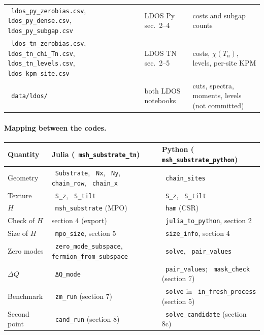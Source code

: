 \documentclass[11pt]{article}
\renewcommand{\code}[1]{\texttt{\hyphenchar\font=-1 #1}}
\begin{document}
\begin{center}
\begin{tabularx}{\textwidth}{>{\raggedright}p{4.6cm}>{\raggedright}p{3.6cm}>{\raggedright\arraybackslash}X}
\code{ldos\_py\_zerobias.csv}, \code{ldos\_py\_dense.csv}, \code{ldos\_py\_subgap.csv} & LDOS Py sec.~2--4 & costs and subgap counts\\
\code{ldos\_tn\_zerobias.csv}, \code{ldos\_tn\_chi\_Tn.csv}, \code{ldos\_tn\_levels.csv}, \code{ldos\_kpm\_site.csv} & LDOS TN sec.~2--5 & costs, $\chi(T_n)$, levels, per-site KPM\\
\code{data/ldos/} & both LDOS notebooks & cuts, spectra, moments, levels (not committed)\\
\bottomrule
\end{tabularx}
\end{center}

\paragraph{Mapping between the codes.}
\begin{center}
\small
\begin{tabularx}{\textwidth}{>{\raggedright}p{3.2cm}>{\raggedright}p{5.4cm}>{\raggedright\arraybackslash}X}
\toprule
Quantity & Julia (\code{msh\_substrate\_tn}) & Python (\code{msh\_substrate\_python})\\
\midrule
Geometry & \code{Substrate}, \code{Nx}, \code{Ny}, \code{chain\_row}, \code{chain\_x} & \code{chain\_sites}\\
Texture & \code{S\_z}, \code{S\_tilt} & \code{S\_z}, \code{S\_tilt}\\
$H$ & \code{msh\_substrate} (MPO) & \code{ham} (CSR)\\
Check of $H$ & section 4 (export) & \code{julia\_to\_python}, section 2\\
Size of $H$ & \code{mpo\_size}, section 5 & \code{size\_info}, section 4\\
Zero modes & \code{zero\_mode\_subspace}, \code{fermion\_from\_subspace} & \code{solve}, \code{pair\_values}\\
$\Delta Q$ & \code{ΔQ\_mode} & \code{pair\_values}; \code{mask\_check} (section 7)\\
Benchmark & \code{zm\_run} (section 7) & \code{solve} in \code{in\_fresh\_process} (section 5)\\
Second point & \code{cand\_run} (section 8) & \code{solve\_candidate} (section 8c)\\
\bottomrule
\end{tabularx}
\end{center}

\clearpage
\end{document}
